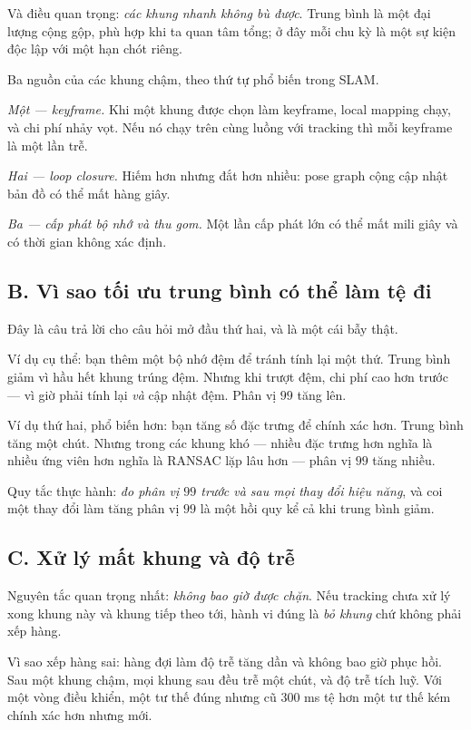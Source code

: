 \documentclass[../../vslam.tex]{subfiles}
\begin{document}
Và điều quan trọng: \emph{các khung nhanh không bù được}. Trung bình là một đại lượng cộng gộp, phù hợp khi ta quan tâm tổng; ở đây mỗi chu kỳ là một sự kiện độc lập với một hạn chót riêng.

Ba nguồn của các khung chậm, theo thứ tự phổ biến trong SLAM.

\emph{Một --- keyframe.} Khi một khung được chọn làm keyframe, local mapping chạy, và chi phí nhảy vọt. Nếu nó chạy trên cùng luồng với tracking thì mỗi keyframe là một lần trễ.

\emph{Hai --- loop closure.} Hiếm hơn nhưng đắt hơn nhiều: pose graph cộng cập nhật bản đồ có thể mất hàng giây.

\emph{Ba --- cấp phát bộ nhớ và thu gom.} Một lần cấp phát lớn có thể mất mili giây và có thời gian không xác định.

\subsection{B. Vì sao tối ưu trung bình có thể làm tệ đi}

Đây là câu trả lời cho câu hỏi mở đầu thứ hai, và là một cái bẫy thật.

Ví dụ cụ thể: bạn thêm một bộ nhớ đệm để tránh tính lại một thứ. Trung bình giảm vì hầu hết khung trúng đệm. Nhưng khi trượt đệm, chi phí cao hơn trước --- vì giờ phải tính lại \emph{và} cập nhật đệm. Phân vị \(99\) tăng lên.

Ví dụ thứ hai, phổ biến hơn: bạn tăng số đặc trưng để chính xác hơn. Trung bình tăng một chút. Nhưng trong các khung khó --- nhiều đặc trưng hơn nghĩa là nhiều ứng viên hơn nghĩa là RANSAC lặp lâu hơn --- phân vị \(99\) tăng nhiều.

Quy tắc thực hành: \emph{đo phân vị \(99\) trước và sau mọi thay đổi hiệu năng}, và coi một thay đổi làm tăng phân vị \(99\) là một hồi quy kể cả khi trung bình giảm.

\subsection{C. Xử lý mất khung và độ trễ}

Nguyên tắc quan trọng nhất: \emph{không bao giờ được chặn}. Nếu tracking chưa xử lý xong khung này và khung tiếp theo tới, hành vi đúng là \emph{bỏ khung} chứ không phải xếp hàng.

Vì sao xếp hàng sai: hàng đợi làm độ trễ tăng dần và không bao giờ phục hồi. Sau một khung chậm, mọi khung sau đều trễ một chút, và độ trễ tích luỹ. Với một vòng điều khiển, một tư thế đúng nhưng cũ \(300\) ms tệ hơn một tư thế kém chính xác hơn nhưng mới.
\end{document}
